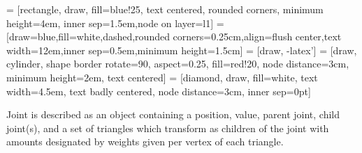 \documentclass{article}
\begin{document}
 = [rectangle, draw, fill=blue!25, text centered, rounded corners, minimum height=4em, inner sep=1.5em,node on layer=l1]
 = [draw=blue,fill=white,dashed,rounded corners=0.25cm,align=flush center,text width=12em,inner sep=0.5em,minimum height=1.5cm]
 = [draw, -latex']
 = [draw, cylinder, shape border rotate=90, aspect=0.25, fill=red!20, node distance=3cm, minimum height=2em, text centered]
 = [diamond, draw, fill=white, text width=4.5em, text badly centered, node distance=3cm, inner sep=0pt]

\newcommand{\nodebox}[2]{\parbox[c]{#1}{\centering #2}}

Joint is described as an object containing a position, value, parent joint, child joint(s), and a set of triangles which transform as children of the joint with amounts designated by weights given per vertex of each triangle.

\begin{figure}[h]
	\centering
	
\end{figure}

\begin{figure}[h]
	\centering
	\resizebox{\textwidth}{!} {
		
	}
\end{figure}
\begin{figure}[h]
	\centering
	
\end{figure}
\end{document}
